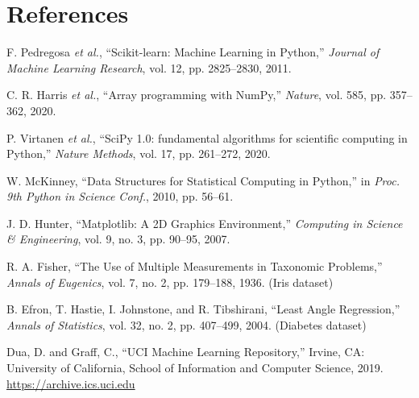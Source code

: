 \documentclass[12pt,a4paper]{article}
\begin{document}
\section{References}
\begin{enumerate}[label={[\arabic*]}]
\item F. Pedregosa \textit{et al.}, ``Scikit-learn: Machine Learning in Python,'' \textit{Journal
of Machine Learning Research}, vol. 12, pp. 2825--2830, 2011.
\item C. R. Harris \textit{et al.}, ``Array programming with NumPy,'' \textit{Nature}, vol. 585,
pp. 357--362, 2020.
\item P. Virtanen \textit{et al.}, ``SciPy 1.0: fundamental algorithms for scientific computing
in Python,'' \textit{Nature Methods}, vol. 17, pp. 261--272, 2020.
\item W. McKinney, ``Data Structures for Statistical Computing in Python,'' in \textit{Proc. 9th
Python in Science Conf.}, 2010, pp. 56--61.
\item J. D. Hunter, ``Matplotlib: A 2D Graphics Environment,'' \textit{Computing in Science \&
Engineering}, vol. 9, no. 3, pp. 90--95, 2007.
\item R. A. Fisher, ``The Use of Multiple Measurements in Taxonomic Problems,'' \textit{Annals of
Eugenics}, vol. 7, no. 2, pp. 179--188, 1936. (Iris dataset)
\item B. Efron, T. Hastie, I. Johnstone, and R. Tibshirani, ``Least Angle Regression,''
\textit{Annals of Statistics}, vol. 32, no. 2, pp. 407--499, 2004. (Diabetes dataset)
\item Dua, D. and Graff, C., ``UCI Machine Learning Repository,'' Irvine, CA: University of
California, School of Information and Computer Science, 2019. \url{https://archive.ics.uci.edu}
\end{enumerate}
\end{document}
